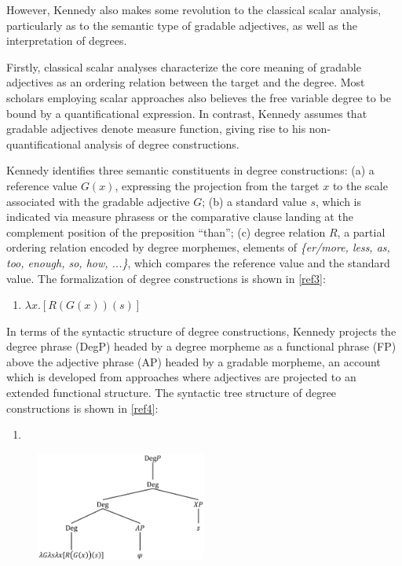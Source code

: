 \documentclass{ctexart}
\let \cite \parencite
\begin{document}
However, Kennedy also makes some revolution to the classical scalar analysis, particularly as to the semantic type of gradable adjectives, as well as the interpretation of degrees.

Firstly, classical scalar analyses characterize the core meaning of gradable adjectives as an ordering relation between the target and the degree. Most scholars employing scalar approaches also believes the free variable degree to be bound by a quantificational expression\cite{hellan1981,hoeksema1983,von1984a}. In contrast, Kennedy assumes that gradable adjectives denote measure function, giving rise to his non-quantificational analysis of degree constructions.

Kennedy identifies three semantic constituents in degree constructions\cite{russell1905}: (a) a reference value $G(x)$, expressing the projection from the target $x$ to the scale associated with the gradable adjective $G$; (b) a standard value $s$, which is indicated via measure phrasess or the comparative clause landing at the complement position of the preposition “than”; (c) degree relation $R$, a partial ordering relation encoded by degree morphemes, elements of \textit{\{er/more, less, as, too, enough, so, how, ...\}}, which compares the reference value and the standard value. The formalization of degree constructions is shown in \ref{ref3}:

\begin{enumerate}[resume]
    \item \label{ref3} $\lambda x.[R(G(x))(s)]$
\end{enumerate}

In terms of the syntactic structure of degree constructions, Kennedy projects the degree phrase (DegP) headed by a degree morpheme as a functional phrase (FP) above the adjective phrase (AP) headed by a gradable morpheme, an account which is developed from approaches where adjectives are projected to an extended functional structure\cite{abney1987,corver1990,corver1997b,grimshaw1991}. The syntactic tree structure of degree constructions is shown in \ref{ref4}:

\begin{enumerate}[resume]
    \item \label{ref4}
\end{enumerate}

\begin{figure}[h]
\centering
\includegraphics[width=0.5\textwidth]{pic/pic1.png}
\end{figure}
\end{document}
